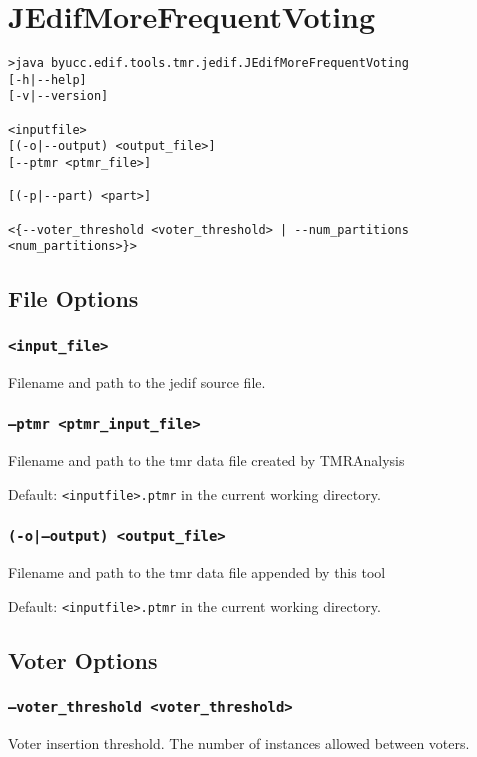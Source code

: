 \section{JEdifMoreFrequentVoting}
\begin{verbatim}
>java byucc.edif.tools.tmr.jedif.JEdifMoreFrequentVoting
[-h|--help] 
[-v|--version] 

<inputfile>
[(-o|--output) <output_file>] 
[--ptmr <ptmr_file>] 

[(-p|--part) <part>] 

<{--voter_threshold <voter_threshold> | --num_partitions <num_partitions>}>

\end{verbatim}

\subsection{File Options}

\subsubsection{\texttt{<input\_file>}}
Filename and path to the jedif source file.

\subsubsection{\texttt{--ptmr <ptmr\_input\_file>}}
Filename and path to the tmr data file created by TMRAnalysis

Default: \texttt{<inputfile>.ptmr} in the current working directory.

\subsubsection{\texttt{(-o|--output) <output\_file>}}
Filename and path to the tmr data file appended by this tool

Default: \texttt{<inputfile>.ptmr} in the current working directory.


\subsection{Voter Options}

\subsubsection{\texttt{--voter\_threshold <voter\_threshold>}}
Voter insertion threshold. The number of instances allowed between voters.

